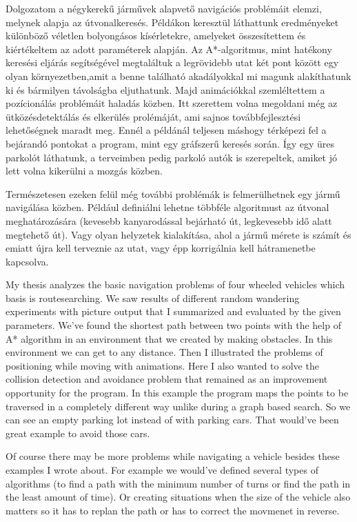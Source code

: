 

Dolgozatom a négykerekű járművek alapvető navigációs problémáit elemzi, melynek alapja az útvonalkeresés. Példákon keresztül láthattunk eredményeket különböző véletlen bolyongásos kísérletekre, amelyeket összesítettem és kiértékeltem az adott paraméterek alapján. Az A*-algoritmus, mint hatékony keresési eljárás segítségével megtaláltuk a legrövidebb utat két pont között egy olyan környezetben,amit a benne található akadályokkal mi magunk alakíthatunk ki és bármilyen távolságba eljuthatunk. Majd animációkkal szemléltettem a pozícionálás problémáit haladás közben. Itt szerettem volna megoldani még az ütközésdetektálás és elkerülés prolémáját, ami sajnos továbbfejlesztési lehetőségnek maradt meg. Ennél a példánál teljesen máshogy térképezi fel a bejárandó pontokat a program, mint egy gráfszerű keresés során. Így egy üres parkolót láthatunk, a terveimben pedig parkoló autók is szerepeltek, amiket jó lett volna kikerülni a mozgás közben.

Természetesen ezeken felül még további problémák is felmerülhetnek egy jármű navigálása közben. Például definiálni lehetne többféle algoritmust az útvonal meghatározására (kevesebb kanyarodással bejárható út, legkevesebb idő alatt megtehető út). Vagy olyan helyzetek kialakítása, ahol a jármű mérete is számít és emiatt újra kell terveznie az utat, vagy épp korrigálnia kell hátramenetbe kapcsolva.


My thesis analyzes the basic navigation problems of four wheeled vehicles which
basis is routesearching. We saw results of different random wandering experiments with
picture output that I summarized and evaluated by the given parameters. We've found the 
shortest path between two points with the help of A* algorithm in an environment that 
we created by making obstacles. In this environment we can get to any distance. Then I 
illustrated the problems of positioning while moving with animations. Here I also wanted
to solve the collision detection and avoidance problem that remained as an improvement
opportunity for the program. In this example the program maps the points to be traversed
in a completely different way unlike during a graph based search. So we can see an empty
parking lot instead of with parking cars. That would've been great example to avoid those
cars.

Of course there may be more problems while navigating a vehicle besides these examples I 
wrote about. For example we would've defined several types of algorithms (to find a path
with the minimum number of turns or find the path in the least amount of time). Or creating
situations when the size of the vehicle also matters so it has to replan the path or has to
correct the movmenet in reverse.
